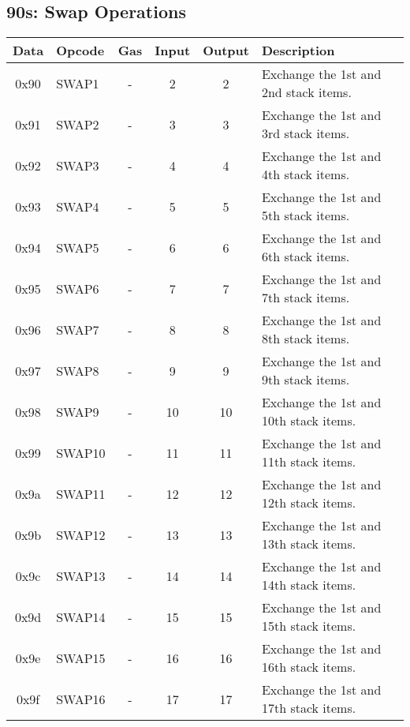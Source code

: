 \documentclass[10pt,a4paper,leqno,bibliography=totoc]{scrartcl}
\newenvironment{alphafootnotes}
{\par\edef\savedfootnotenumber{\number\value{footnote}}
\renewcommand{\thefootnote}{\alph{footnote}}
\setcounter{footnote}{0}}
{\par\setcounter{footnote}{\savedfootnotenumber}}
\begin{document}
\begin{alphafootnotes}
		\subsection{90s: Swap Operations}
			\begin{longtable}{|cP{2.8cm}cccp{6cm}|}
		        \hline  
		        \textbf{Data} & \textbf{Opcode} & \textbf{Gas}  & \textbf{Input}  & \textbf{Output} & \textbf{Description} \\
		        \hline  
			0x90 & SWAP1 & - & 2 & 2 & Exchange the 1st and 2nd stack items. \\
			0x91 & SWAP2 & - & 3 & 3 & Exchange the 1st and 3rd stack items. \\
			0x92 & SWAP3 & - & 4 & 4 & Exchange the 1st and 4th stack items. \\
			0x93 & SWAP4 & - & 5 & 5 & Exchange the 1st and 5th stack items. \\
			0x94 & SWAP5 & - & 6 & 6 & Exchange the 1st and 6th stack items. \\
			0x95 & SWAP6 & - & 7 & 7 & Exchange the 1st and 7th stack items. \\
			0x96 & SWAP7 & - & 8 & 8 & Exchange the 1st and 8th stack items. \\
			0x97 & SWAP8 & - & 9 & 9 & Exchange the 1st and 9th stack items. \\
			0x98 & SWAP9 & - & 10 & 10 & Exchange the 1st and 10th stack items. \\
			0x99 & SWAP10 & - & 11 & 11 & Exchange the 1st and 11th stack items. \\
			0x9a & SWAP11 & - & 12 & 12 & Exchange the 1st and 12th stack items. \\
			0x9b & SWAP12 & - & 13 & 13 & Exchange the 1st and 13th stack items. \\
			0x9c & SWAP13 & - & 14 & 14 & Exchange the 1st and 14th stack items. \\
			0x9d & SWAP14 & - & 15 & 15 & Exchange the 1st and 15th stack items. \\
			0x9e & SWAP15 & - & 16 & 16 & Exchange the 1st and 16th stack items. \\
			0x9f & SWAP16 & - & 17 & 17 & Exchange the 1st and 17th stack items. \\	
			\hline
			\end{longtable}


\end{alphafootnotes}
\end{document}
